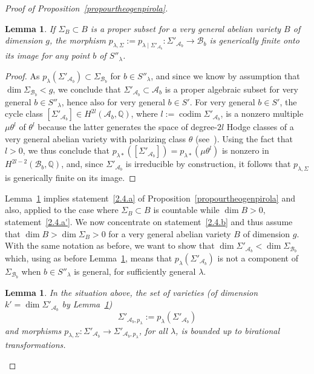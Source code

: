 \documentclass[11pt]{article}
\newtheorem{lemm}[theo]{Lemma}
\theoremstyle{definition}
\numberwithin{equation}{section}
\numberwithin{figure}{section}
\numberwithin{table}{section}
\DeclareMathOperator{\codim}{codim}
\begin{document}
\begin{proof}[Proof of Proposition~\ref{propourtheogenpirola}]
\begin{lemm}\label{lefini}
If $\Sigma_B\subset B$ is a proper subset for a very general
abelian variety $B$ of dimension $g$, the morphism $p_{\lambda,\Sigma}:=p_{\lambda\mid \Sigma'_{\mathcal{A}_b}}:\Sigma'_{\mathcal{A}_b}\rightarrow \mathcal{B}_b$ is generically finite onto its image for any point $b$ of $S''_\lambda$.
\end{lemm}

\begin{proof}
As $p_\lambda(\Sigma'_{\mathcal{A}_b})\subset \Sigma_{\mathcal{B}_b}$ for $b\in S''_\lambda$, and since we know by assumption that $\dim \Sigma_{\mathcal{B}_b}<g$, we conclude that $\Sigma'_{\mathcal{A}_b}\subset \mathcal{A}_b$ is a proper algebraic subset for very general $b\in S''_\lambda$, hence also for very general $b\in S'$. For very general $b\in S'$, the cycle class $[\Sigma'_{\mathcal{A}_b}]\in H^{2l}(\mathcal{A}_b,\mathbb{Q})$, where $l:=\codim \Sigma'_{\mathcal{A}_b}$, is a nonzero multiple $\mu \theta^l$ of $\theta^l$ because the latter generates the space of degree-$2l$ Hodge classes of a very general abelian variety with polarizing class $\theta$ (see~\cite{mattuck}). Using the fact that $l>0$, we thus conclude that $p_{\lambda*}([\Sigma'_{\mathcal{A}_b}])=p_{\lambda*}(\mu \theta^l)$ is nonzero in $H^{2l-2}(\mathcal{B}_b,\mathbb{Q})$, and, since $\Sigma'_{\mathcal{A}_b}$ is irreducible by construction, it follows that $p_{\lambda,\Sigma}$ is generically finite on its image.
\end{proof}

Lemma~\ref{lefini} implies statement~\eqref{2.4.a} of Proposition~\ref{propourtheogenpirola} and also, applied to the case where $\Sigma_{{B}}\subset {B}$ is countable while $\dim {B}>0$, statement~\eqref{2.4.a'}. We now concentrate on statement~\eqref{2.4.b} and thus assume that $\dim B>\dim \Sigma_B>0$ for a very general abelian variety $B$ of dimension $g$. With the same notation as before, we want to show that $\dim \Sigma'_{\mathcal{A}_b}<\dim \Sigma_{\mathcal{B}_b}$ which, using as before Lemma~\ref{lefini}, means that $p_\lambda(\Sigma'_{\mathcal{A}_b})$ is not a component of $\Sigma_{\mathcal{B}_b}$ when $b\in S''_\lambda$ is general, for sufficiently general $\lambda$.

\begin{lemm}\label{lebounded}
In the situation above, the set of varieties (of dimension $k'=\dim \Sigma'_{\mathcal{A}_b}$ by Lemma~\ref{lefini})
\[
\Sigma'_{\mathcal{A}_b,p_\lambda}:=p_\lambda(\Sigma'_{\mathcal{A}_b})
\]
and morphisms $ p_{\lambda,\Sigma}: \Sigma'_{\mathcal{A}_b}\rightarrow \Sigma'_{\mathcal{A}_b,p_\lambda}$, for all $\lambda$, is bounded up to birational transformations.
\end{lemm}


\end{proof}
\end{document}
